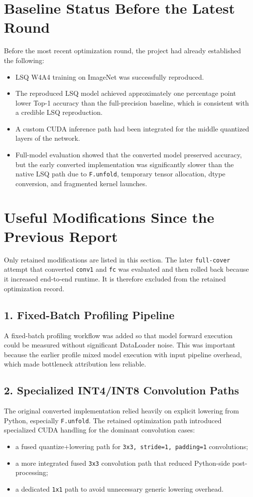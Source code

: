 \documentclass[11pt,a4paper]{article}
\begin{document}
\section{Baseline Status Before the Latest Round}
Before the most recent optimization round, the project had already established the following:
\begin{itemize}
  \item LSQ W4A4 training on ImageNet was successfully reproduced.
  \item The reproduced LSQ model achieved approximately one percentage point lower Top-1 accuracy than the full-precision baseline, which is consistent with a credible LSQ reproduction.
  \item A custom CUDA inference path had been integrated for the middle quantized layers of the network.
  \item Full-model evaluation showed that the converted model preserved accuracy, but the early converted implementation was significantly slower than the native LSQ path due to \texttt{F.unfold}, temporary tensor allocation, dtype conversion, and fragmented kernel launches.
\end{itemize}

\section{Useful Modifications Since the Previous Report}
Only retained modifications are listed in this section. The later \texttt{full-cover} attempt that converted \texttt{conv1} and \texttt{fc} was evaluated and then rolled back because it increased end-to-end runtime. It is therefore excluded from the retained optimization record.

\subsection{1. Fixed-Batch Profiling Pipeline}
A fixed-batch profiling workflow was added so that model forward execution could be measured without significant DataLoader noise. This was important because the earlier profile mixed model execution with input pipeline overhead, which made bottleneck attribution less reliable.

\subsection{2. Specialized INT4/INT8 Convolution Paths}
The original converted implementation relied heavily on explicit lowering from Python, especially \texttt{F.unfold}. The retained optimization path introduced specialized CUDA handling for the dominant convolution cases:
\begin{itemize}
  \item a fused quantize+lowering path for \texttt{3x3, stride=1, padding=1} convolutions;
  \item a more integrated fused \texttt{3x3} convolution path that reduced Python-side post-processing;
  \item a dedicated \texttt{1x1} path to avoid unnecessary generic lowering overhead.
\end{itemize}
\end{document}
